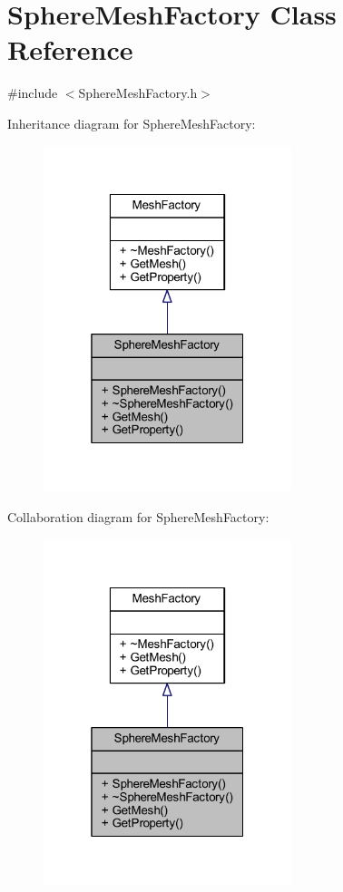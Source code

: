 \hypertarget{class_sphere_mesh_factory}{}\section{Sphere\+Mesh\+Factory Class Reference}
\label{class_sphere_mesh_factory}


{\ttfamily \#include $<$Sphere\+Mesh\+Factory.\+h$>$}



Inheritance diagram for Sphere\+Mesh\+Factory\+:
\nopagebreak
\begin{figure}[H]
\begin{center}
\leavevmode
\includegraphics[width=205pt]{class_sphere_mesh_factory__inherit__graph}
\end{center}
\end{figure}


Collaboration diagram for Sphere\+Mesh\+Factory\+:
\nopagebreak
\begin{figure}[H]
\begin{center}
\leavevmode
\includegraphics[width=205pt]{class_sphere_mesh_factory__coll__graph}
\end{center}
\end{figure}
